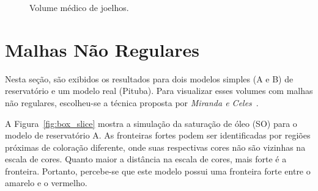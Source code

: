 \begin{figure}[h]
	\centering
	\caption{Volume médico de joelhos.}
\end{figure}

\clearpage
\section{Malhas Não Regulares}
\label{sec:result.irreg}

	Nesta seção, são exibidos os resultados para dois modelos simples (A e B) de reservatório e um modelo real (Pituba). Para visualizar esses volumes com malhas não regulares, escolheu-se a técnica proposta por \textit{Miranda e Celes}~\cite{miranda}.
	
	A Figura~\ref{fig:box_slice} mostra a simulação da saturação de óleo (SO) para o modelo de reservatório A. As fronteiras fortes podem ser identificadas por regiões próximas de coloração diferente, onde suas respectivas cores não são vizinhas na escala de cores. Quanto maior a distância na escala de cores, mais forte é a fronteira. Portanto, percebe-se que este modelo possui uma fronteira forte entre o amarelo e o vermelho.\\
	
